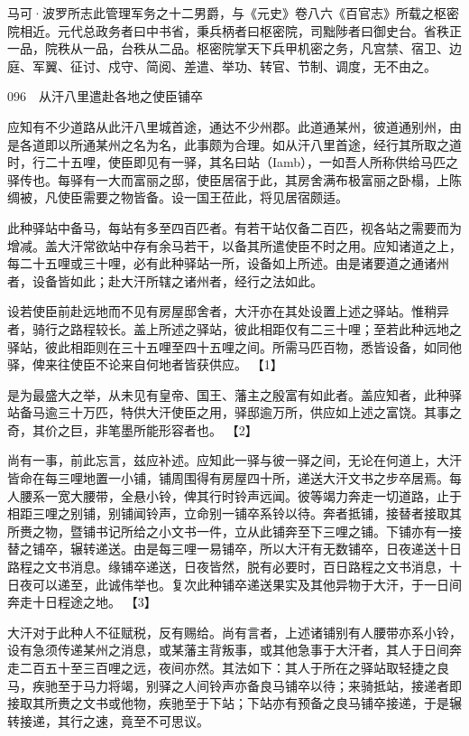 \documentclass[12pt,UTF8]{ctexbook}
\begin{document}
马可·波罗所志此管理军务之十二男爵，与《元史》卷八六《百官志》所载之枢密院相近。元代总政务者曰中书省，秉兵柄者曰枢密院，司黜陟者曰御史台。省秩正一品，院秩从一品，台秩从二品。枢密院掌天下兵甲机密之务，凡宫禁、宿卫、边庭、军翼、征讨、戍守、简阅、差遣、举功、转官、节制、调度，无不由之。





096　从汗八里遣赴各地之使臣铺卒

应知有不少道路从此汗八里城首途，通达不少州郡。此道通某州，彼道通别州，由是各道即以所通某州之名为名，此事颇为合理。如从汗八里首途，经行其所取之道时，行二十五哩，使臣即见有一驿，其名曰站（Iamb），一如吾人所称供给马匹之驿传也。每驿有一大而富丽之邸，使臣居宿于此，其房舍满布极富丽之卧榻，上陈绸被，凡使臣需要之物皆备。设一国王莅此，将见居宿颇适。

此种驿站中备马，每站有多至四百匹者。有若干站仅备二百匹，视各站之需要而为增减。盖大汗常欲站中存有余马若干，以备其所遣使臣不时之用。应知诸道之上，每二十五哩或三十哩，必有此种驿站一所，设备如上所述。由是诸要道之通诸州者，设备皆如此；赴大汗所辖之诸州者，经行之法如此。

设若使臣前赴远地而不见有房屋邸舍者，大汗亦在其处设置上述之驿站。惟稍异者，骑行之路程较长。盖上所述之驿站，彼此相距仅有二三十哩；至若此种远地之驿站，彼此相距则在三十五哩至四十五哩之间。所需马匹百物，悉皆设备，如同他驿，俾来往使臣不论来自何地者皆获供应。 【1】

是为最盛大之举，从未见有皇帝、国王、藩主之殷富有如此者。盖应知者，此种驿站备马逾三十万匹，特供大汗使臣之用，驿邸逾万所，供应如上述之富饶。其事之奇，其价之巨，非笔墨所能形容者也。 【2】

尚有一事，前此忘言，兹应补述。应知此一驿与彼一驿之间，无论在何道上，大汗皆命在每三哩地置一小铺，铺周围得有房屋四十所，递送大汗文书之步卒居焉。每人腰系一宽大腰带，全悬小铃，俾其行时铃声远闻。彼等竭力奔走一切道路，止于相距三哩之别铺，别铺闻铃声，立命别一铺卒系铃以待。奔者抵铺，接替者接取其所赉之物，暨铺书记所给之小文书一件，立从此铺奔至下三哩之铺。下铺亦有一接替之铺卒，辗转递送。由是每三哩一易铺卒，所以大汗有无数铺卒，日夜递送十日路程之文书消息。缘铺卒递送，日夜皆然，脱有必要时，百日路程之文书消息，十日夜可以递至，此诚伟举也。复次此种铺卒递送果实及其他异物于大汗，于一日间奔走十日程途之地。 【3】

大汗对于此种人不征赋税，反有赐给。尚有言者，上述诸铺别有人腰带亦系小铃，设有急须传递某州之消息，或某藩主背叛事，或其他急事于大汗者，其人于日间奔走二百五十至三百哩之远，夜间亦然。其法如下：其人于所在之驿站取轻捷之良马，疾驰至于马力将竭，别驿之人间铃声亦备良马铺卒以待；来骑抵站，接递者即接取其所赉之文书或他物，疾驰至于下站；下站亦有预备之良马铺卒接递，于是辗转接递，其行之速，竟至不可思议。
\end{document}
